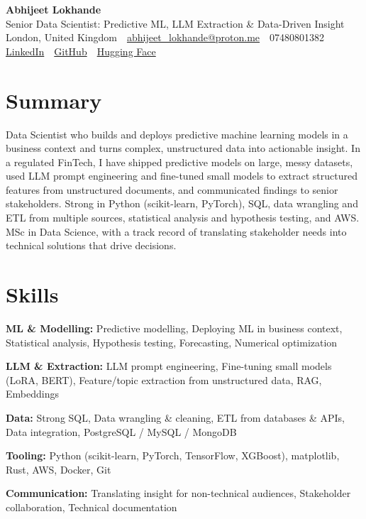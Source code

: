 \documentclass[10pt,a4paper]{article}
\newcommand{\sep}{\,\textcolor{accent!60}{\textbar}\,}
\begin{document}
\begin{center}
  {\fontsize{24}{26}\selectfont\bfseries Abhijeet Lokhande}\\[3pt]
  {\color{accent}\large Senior Data Scientist: Predictive ML, LLM Extraction \& Data-Driven Insight}\\[5pt]
  {\small
    London, United Kingdom \sep
    \href{mailto:abhijeet_lokhande@proton.me}{abhijeet\_lokhande@proton.me} \sep
    07480801382 \\[2pt]
    \href{https://www.linkedin.com/in/ablds/}{LinkedIn} \sep
    \href{https://github.com/abhijeetscode}{GitHub} \sep
    \href{https://huggingface.co/ab-ai}{Hugging Face}
  }
\end{center}
\vspace{2pt}

\section{Summary}
Data Scientist who builds and deploys predictive machine learning models in a business context and turns complex, unstructured data into actionable insight. In a regulated FinTech, I have shipped predictive models on large, messy datasets, used LLM prompt engineering and fine-tuned small models to extract structured features from unstructured documents, and communicated findings to senior stakeholders. Strong in Python (scikit-learn, PyTorch), SQL, data wrangling and ETL from multiple sources, statistical analysis and hypothesis testing, and AWS. MSc in Data Science, with a track record of translating stakeholder needs into technical solutions that drive decisions.

\section{Skills}
\begin{tight}
  \item[\textcolor{accent}{\small$\bullet$}] \textbf{ML \& Modelling:} Predictive modelling, Deploying ML in business context, Statistical analysis, Hypothesis testing, Forecasting, Numerical optimization
  \item[\textcolor{accent}{\small$\bullet$}] \textbf{LLM \& Extraction:} LLM prompt engineering, Fine-tuning small models (LoRA, BERT), Feature/topic extraction from unstructured data, RAG, Embeddings
  \item[\textcolor{accent}{\small$\bullet$}] \textbf{Data:} Strong SQL, Data wrangling \& cleaning, ETL from databases \& APIs, Data integration, PostgreSQL / MySQL / MongoDB
  \item[\textcolor{accent}{\small$\bullet$}] \textbf{Tooling:} Python (scikit-learn, PyTorch, TensorFlow, XGBoost), matplotlib, Rust, AWS, Docker, Git
  \item[\textcolor{accent}{\small$\bullet$}] \textbf{Communication:} Translating insight for non-technical audiences, Stakeholder collaboration, Technical documentation
\end{tight}
\end{document}
